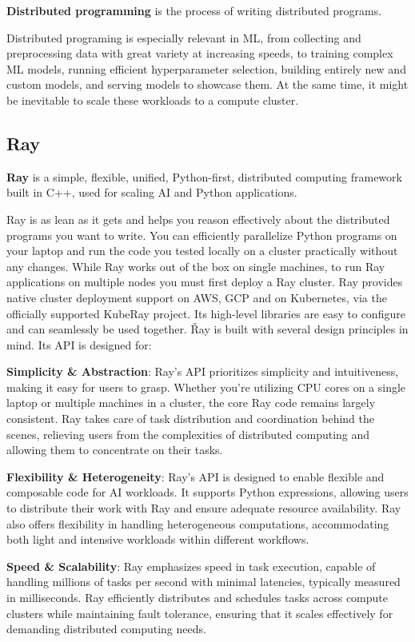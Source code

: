 \textbf{Distributed programming} is the process of writing distributed programs.
\ed

Distributed programing is especially relevant in ML, from collecting and preprocessing data with great variety at
increasing speeds, to training complex ML models, running efficient hyperparameter selection, building
entirely new and custom models, and serving models to showcase them. At the same time, it might be inevitable to
scale these workloads to a compute cluster.

\subsection{Ray}
    
\bd[Ray]
\textbf{Ray} is a simple, flexible, unified, Python-first, distributed computing framework built in C++, used for
scaling AI and Python applications.
\ed

Ray is as lean as it gets and helps you reason effectively about the distributed programs you want to write. You can
efficiently parallelize Python programs on your laptop and run the code you tested locally on a cluster practically
without any changes. While Ray works out of the box on single machines, to run Ray applications on multiple nodes you
must first deploy a Ray cluster. Ray provides native cluster deployment support on AWS, GCP and on Kubernetes, via
the officially supported KubeRay project. Its high-level libraries are easy to configure and can seamlessly be used
together. \v

Ray is built with several design principles in mind. Its API is designed for:
\bit
\item \textbf{Simplicity \& Abstraction}: Ray's API prioritizes simplicity and intuitiveness, making it easy for 
users to grasp. Whether you're utilizing CPU cores on a single laptop or multiple machines in a cluster, the core Ray
code remains largely consistent. Ray takes care of task distribution and coordination behind the scenes, relieving 
users from the complexities of distributed computing and allowing them to concentrate on their tasks.
\item \textbf{Flexibility \& Heterogeneity}: Ray's API is designed to enable flexible and composable code for AI 
workloads. It supports Python expressions, allowing users to distribute their work with Ray and ensure adequate 
resource availability. Ray also offers flexibility in handling heterogeneous computations, accommodating both light 
and intensive workloads within different workflows.
\item \textbf{Speed \& Scalability}: Ray emphasizes speed in task execution, capable of handling millions of tasks 
per second with minimal latencies, typically measured in milliseconds. Ray efficiently distributes and schedules 
tasks across compute clusters while maintaining fault tolerance, ensuring that it scales effectively for demanding 
distributed computing needs.
\eit

